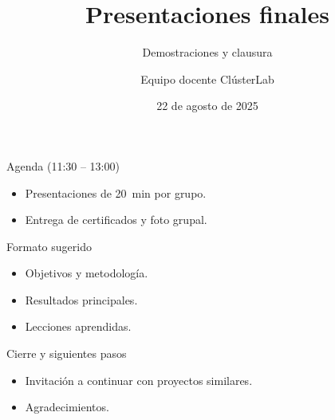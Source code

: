 \documentclass[aspectratio=169,professionalfonts]{beamer}
\title[Cl\'usterLab \bullet{} D\'ia 8]{Presentaciones finales}
\subtitle{Demostraciones y clausura}
\author{Equipo docente Cl\'usterLab}
\date{22 de agosto de 2025}
\begin{document}
\begin{frame}[plain]
  \titlepage
\end{frame}

\begin{frame}{Agenda (11:30 -- 13:00)}
  \begin{itemize}
    \item Presentaciones de 20~min por grupo.
    \item Entrega de certificados y foto grupal.
  \end{itemize}
\end{frame}

\begin{frame}{Formato sugerido}
  \begin{itemize}
    \item Objetivos y metodolog\'ia.
    \item Resultados principales.
    \item Lecciones aprendidas.
  \end{itemize}
\end{frame}

\begin{frame}{Cierre y siguientes pasos}
  \begin{itemize}
    \item Invitaci\'on a continuar con proyectos similares.
    \item Agradecimientos.
  \end{itemize}
\end{frame}
\end{document}

